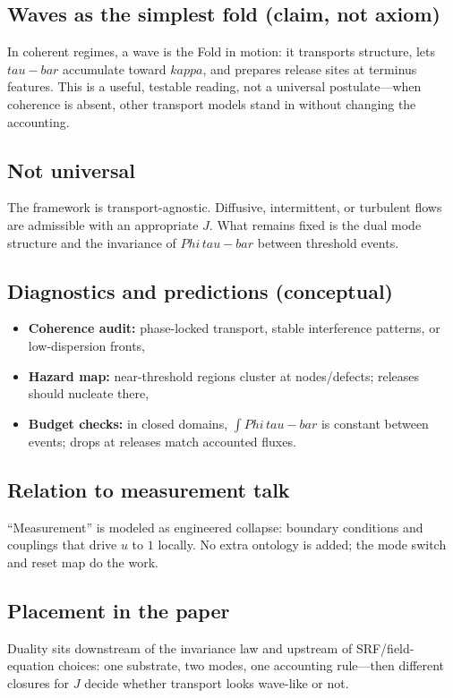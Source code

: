 \documentclass[12pt]{article}
\newcommand{\FoldDensity}{\Phi}
\newcommand{\FoldTime}{\bar{\tau}}
\newcommand{\Threshold}{\kappa}
\def\FoldDensity{Phi}%
\def\FoldTime{tau-bar}%
\def\Threshold{kappa}%
\def\bar#1{#1}%
\begin{document}
\subsection{Waves as the simplest fold (claim, not axiom)}
In coherent regimes, a wave is the Fold in motion: it transports structure, lets $\FoldTime$ accumulate toward $\Threshold$, and prepares release sites at terminus features.
This is a useful, testable reading, not a universal postulate—when coherence is absent, other transport models stand in without changing the accounting.

\subsection{Not universal}
The framework is transport-agnostic. Diffusive, intermittent, or turbulent flows are admissible with an appropriate $J$.
What remains fixed is the dual mode structure and the invariance of $\FoldDensity\,\FoldTime$ between threshold events.

\subsection{Diagnostics and predictions (conceptual)}
\begin{itemize}
  \item \textbf{Coherence audit:} phase-locked transport, stable interference patterns, or low-dispersion fronts,
  \item \textbf{Hazard map:} near-threshold regions cluster at nodes/defects; releases should nucleate there,
  \item \textbf{Budget checks:} in closed domains, $\int \FoldDensity\,\FoldTime$ is constant between events; drops at releases match accounted fluxes.
\end{itemize}

\subsection{Relation to measurement talk}
``Measurement'' is modeled as engineered collapse: boundary conditions and couplings that drive $u$ to $1$ locally.
No extra ontology is added; the mode switch and reset map do the work.

\subsection{Placement in the paper}
Duality sits downstream of the invariance law and upstream of SRF/field-equation choices:
one substrate, two modes, one accounting rule—then different closures for $J$ decide whether transport looks wave-like or not.
\end{document}
